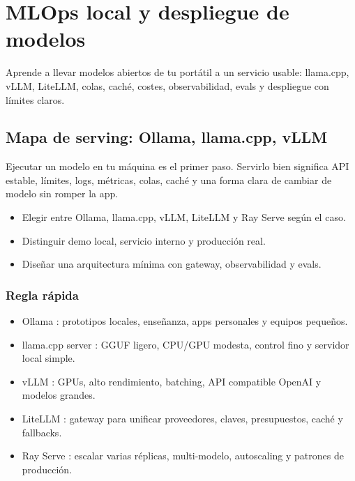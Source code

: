 \documentclass[11pt,a4paper]{book}
\begin{document}
\part{MLOps local y despliegue de modelos}
Aprende a llevar modelos abiertos de tu portátil a un servicio usable: llama.cpp, vLLM, LiteLLM, colas, caché, costes, observabilidad, evals y despliegue con límites claros.

\chapter{Mapa de serving: Ollama, llama.cpp, vLLM}
Ejecutar un modelo en tu máquina es el primer paso. Servirlo bien significa API estable, límites, logs, métricas, colas, caché y una forma clara de cambiar de modelo sin romper la app.

\begin{itemize}\item Elegir entre Ollama, llama.cpp, vLLM, LiteLLM y Ray Serve según el caso.\end{itemize}
\begin{itemize}\item Distinguir demo local, servicio interno y producción real.\end{itemize}
\begin{itemize}\item Diseñar una arquitectura mínima con gateway, observabilidad y evals.\end{itemize}
\section{Regla rápida}
\begin{itemize}\item Ollama : prototipos locales, enseñanza, apps personales y equipos pequeños.\end{itemize}
\begin{itemize}\item llama.cpp server : GGUF ligero, CPU/GPU modesta, control fino y servidor local simple.\end{itemize}
\begin{itemize}\item vLLM : GPUs, alto rendimiento, batching, API compatible OpenAI y modelos grandes.\end{itemize}
\begin{itemize}\item LiteLLM : gateway para unificar proveedores, claves, presupuestos, caché y fallbacks.\end{itemize}
\begin{itemize}\item Ray Serve : escalar varias réplicas, multi-modelo, autoscaling y patrones de producción.\end{itemize}
\end{document}
